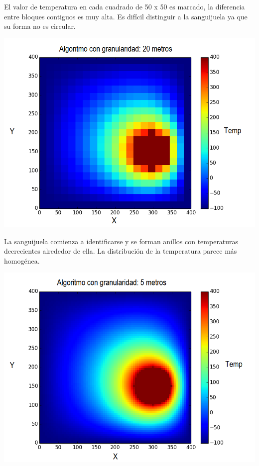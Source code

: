 	El valor de temperatura en cada cuadrado de 50 x 50 es marcado, la diferencia entre bloques contiguos es muy alta. Es difícil distinguir a la sanguijuela ya que su forma no es circular.

	\begin{center}
		\includegraphics[width=\textwidth]{./img/granularidad/g20_t400_sinkill.png}
	\end{center}

	La sanguijuela comienza a identificarse y se forman anillos con temperaturas decrecientes alrededor de ella. La distribución de la temperatura parece más homogénea.

	\begin{center}
		\includegraphics[width=\textwidth]{./img/granularidad/g5_t400_sinkill.png}
	\end{center}


